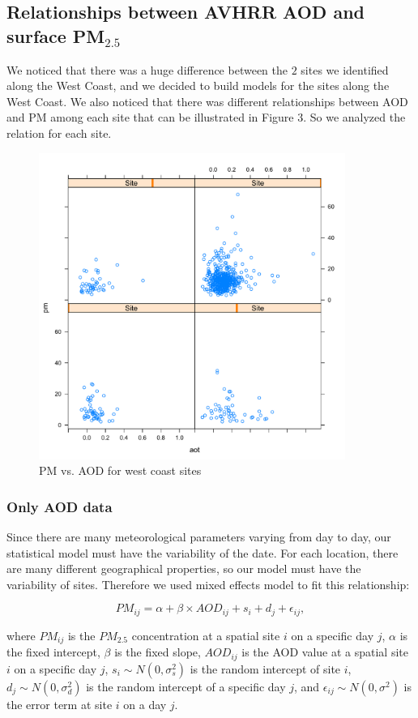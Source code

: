 \documentclass[10pt]{article}
\begin{document}


\subsection{Relationships between AVHRR AOD and surface PM$_{2.5}$}
We noticed that there was a huge difference between the  $2$ sites we identified along the West Coast, and we decided to build models for the sites along the West Coast. We also noticed that there was different relationships between AOD and PM among each site that can be illustrated in Figure 3. So we analyzed the relation for each site. 

\begin{figure}[!h]
\centering
\includegraphics[width = 100mm]{3.pdf}
\caption{PM vs. AOD for west coast sites}
\label{fig3.2.1}
\end{figure}


\subsubsection{Only AOD data}
Since there are many meteorological parameters varying from day to day, our statistical model must have the variability of the date. For each location, there are many different geographical properties, so our model must have the variability of sites. Therefore we used mixed effects model to fit this relationship:

$$PM_{ij} = \alpha + \beta\times AOD_{ij} + s_i + d_j+ \epsilon_{ij}, $$

where $PM_{ij}$ is the $PM_{2.5}$ concentration at a spatial site $i$ on a specific day $j$, $\alpha$ is the fixed intercept, $\beta$ is the fixed slope, $AOD_{ij}$ is the AOD value at a spatial site $i$ on a specific day $j$, $s_i\sim N(0, \sigma_s^2)$ is the random intercept of site $i$, $d_j\sim N(0, \sigma_d^2)$ is the random intercept of a specific day $j$, and $\epsilon_{ij}\sim N(0, \sigma^2)$ is the error term at site $i$ on a day $j$.
\end{document}
